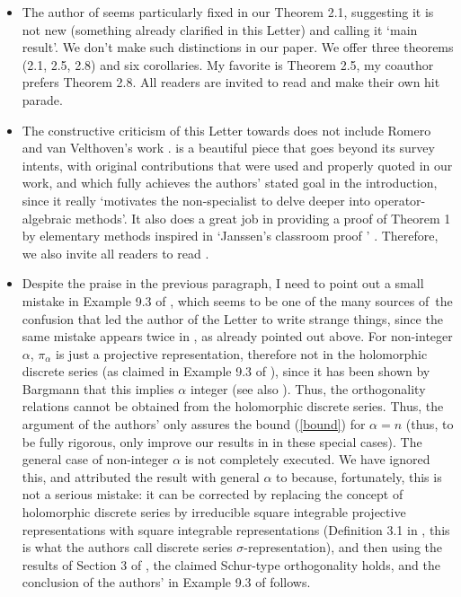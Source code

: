 \documentclass[11pt,reqno]{amsart}
\numberwithin{equation}{section}
\theoremstyle{plain}
\theoremstyle{definition}
\theoremstyle{remark}
\begin{document}
\begin{itemize}
\item The author of \cite{Letter} seems particularly fixed in our Theorem
2.1, suggesting it is not new (something already clarified in this Letter)
and calling it `main result'. We don't make such distinctions in our paper.
We offer three theorems (2.1, 2.5, 2.8) and six corollaries. My favorite is
Theorem 2.5, my coauthor prefers Theorem 2.8. All readers are invited to
read \cite{Affine} and make their own hit parade.

\item The constructive criticism of this Letter towards \cite{Letter} does
not include Romero and van Velthoven's work \cite{Jordi}. \cite{Jordi} is a
beautiful piece that goes beyond its survey intents, with original
contributions that were used and properly quoted in our work, and which
fully achieves the authors' stated goal in the introduction, since it really
`motivates the non-specialist to delve deeper into operator-algebraic
methods'. It also does a great job in providing a proof of Theorem 1 by
elementary methods inspired in `Janssen's classroom proof ' \cite{janssen}.
Therefore, we also invite all readers to read \cite{Jordi}.

\item Despite the praise in the previous paragraph, I need to point out a
small mistake in Example 9.3 of \cite{Jordi}, which seems to be one of the
many sources of\ the confusion that led the author of the Letter \cite%
{Letter} to write strange things, since the same mistake appears twice in 
\cite{Letter}, as already pointed out above. For non-integer $\alpha $, $\pi
_{\alpha }$ is just a projective representation, therefore not in the
holomorphic discrete series (as claimed in Example 9.3 of \cite{Jordi}),
since it has been shown by Bargmann \cite[5g, II]{Bar} that this implies $%
\alpha $ integer (see also \cite[3.3]{delaHarpe}). Thus, the orthogonality
relations cannot be obtained from the holomorphic discrete series. Thus, the
argument of the authors' only assures the bound (\ref{bound}) for $\alpha =n$
(thus, to be fully rigorous, only improve our results in \cite{AoP} in these
special cases). The general case of non-integer $\alpha $ is not completely
executed. We have ignored this, and attributed the result with general $%
\alpha $ to \cite{Jordi} because, fortunately, this is not a serious
mistake: it can be corrected by replacing the concept of holomorphic
discrete series by irreducible square integrable projective representations
with square integrable representations (Definition 3.1 in \cite{Radulescu},
this is what the authors call discrete series $\sigma $-representation), and
then using the results of Section 3 of \cite{Radulescu}, the claimed
Schur-type orthogonality holds, and the conclusion of the authors' in
Example 9.3 of \cite{Jordi} follows.


\end{itemize}
\end{document}
